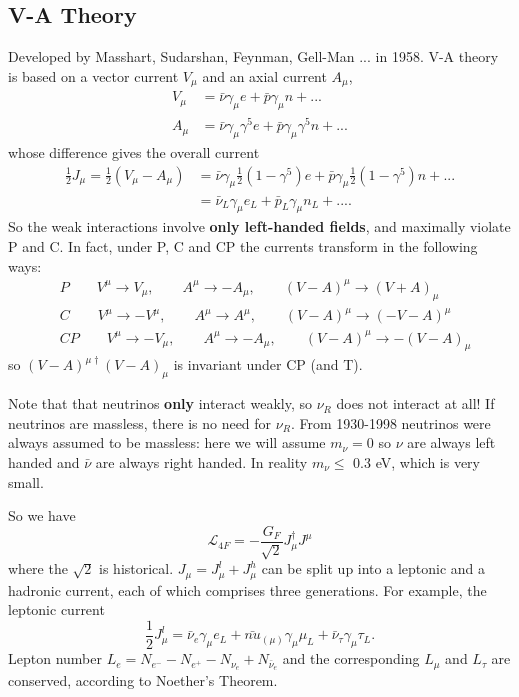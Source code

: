 \documentclass[a4paper,12pt]{article}
\begin{document}
\subsection{V-A Theory}
%
Developed by Masshart, Sudarshan, Feynman, Gell-Man ... in 1958. V-A theory is based on a vector current $V_\mu$ and an axial current $A_\mu$,
\begin{equation}
\begin{split}
V_\mu &= \bar{\nu}\gamma_\mu e + \bar{p}\gamma_\mu n + ... \\
A_\mu &= \bar{\nu}\gamma_\mu \gamma^5 e + \bar{p}\gamma_\mu \gamma^5 n + ...
\end{split}
\end{equation}
whose difference gives the overall current
\begin{equation}
\begin{split}
\frac{1}{2}J_\mu = \frac{1}{2}(V_\mu - A_\mu)  &= \bar{\nu}\gamma_\mu\frac{1}{2}(1-\gamma^5) e + \bar{p}\gamma_\mu\frac{1}{2}(1-\gamma^5) n + ... \\
&= \bar{\nu}_L\gamma_\mu e_L + \bar{p}_L\gamma_\mu n_L + ... .
\end{split}
\end{equation}
So the weak interactions involve \textbf{only left-handed fields}, and maximally violate P and C. In fact, under P, C and CP the currents transform in the following ways:
\begin{equation}
\begin{split}
&P \qquad V^\mu \to V_\mu, \qquad A^\mu \to -A_\mu, \qquad (V-A)^\mu \to (V+A)_\mu \\
&C \qquad V^\mu \to -V^\mu, \qquad A^\mu \to A^\mu, \qquad (V-A)^\mu \to (-V-A)^\mu \\
&CP \qquad V^\mu \to -V_\mu, \qquad A^\mu \to -A_\mu, \qquad (V-A)^\mu \to -(V-A)_\mu 
\end{split}
\end{equation}
so $(V-A)^{\mu \dagger}(V-A)_\mu$ is invariant under CP (and T). 

Note that that neutrinos \textbf{only} interact weakly, so $\nu_R$ does not interact at all! If neutrinos are massless, there is no need for $\nu_R$. From 1930-1998 neutrinos were always assumed to be massless: here we will assume $m_\nu=0$ so $\nu$ are always left handed and $\bar{\nu}$ are always right handed. In reality $m_\nu \leq$ 0.3 eV, which is very small.

So we have
%
\begin{equation}
\mathcal{L}_{4F} = -\frac{G_F}{\sqrt{2}} J_\mu^\dagger J^\mu
\end{equation}
where the $\sqrt{2}$ is historical. $J_\mu = J_\mu^l + J_\mu^h$ can be split up into a leptonic and a hadronic current, each of which comprises three generations. For example, the leptonic current
\begin{equation}
\frac{1}{2}J_\mu^l = \bar{\nu}_e\gamma_\mu e_L + \bar{nu}_{(\mu)}\gamma_\mu \mu_L + \bar{\nu}_\tau \gamma_\mu \tau_L.
\end{equation}
Lepton number $L_e = N_{e^-} - N_{e^+} - N_{\nu_e} + N_{\bar{\nu}_e}$ and the corresponding $L_\mu$ and $L_\tau$ are conserved, according to Noether's Theorem.  
\end{document}

